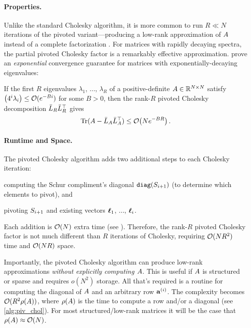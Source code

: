 \paragraph{Properties.}
Unlike the standard Cholesky algorithm, it is more common to run $R \ll N$ iterations of the pivoted variant---producing a low-rank approximation of $A$ instead of a complete factorization \cite{harbrecht2012low}.
For matrices with rapidly decaying spectra, the partial pivoted Cholesky factor is a remarkably effective approximation.
\citet{harbrecht2012low} prove an \emph{exponential} convergence guarantee for matrices with exponentially-decaying eigenvalues:
%
\begin{lemma}
\label{thm:harbrecht}
  If the first $R$ eigenvalues $\lambda_1$, $\ldots$, $\lambda_R$ of a positive-definite $A \in \mathbb{R}^{N \times N}$ satisfy $\left( 4^{i}\lambda_{i} \right) \leq \bigo{e^{-Bi}}$ for some $B>0$,
  then the rank-$R$ pivoted Cholesky decomposition $\bar{L}_{R} \bar{L}_R^\top$ gives
  \[
    \textrm{Tr}(\bA -  \bar\bL_A \bar\bL_A^\top) \leq \bigo{N e^{-BR}}.
  \]
\end{lemma}


\paragraph{Runtime and Space.}
The pivoted Cholesky algorithm adds two additional steps to each Cholesky iteration:
%
\begin{enumerate*}
  \item computing the Schur compliment's diagonal $\texttt{diag}(S_{i+1})$ (to determine which elements to pivot), and
  \item pivoting $S_{i+1}$ and existing vectors $\boldsymbol{\ell}_1$, $\ldots$, $\boldsymbol{\ell}_i$.
\end{enumerate*}
%
Each addition is $\bigo{N}$ extra time (see \citep[][Thm. 1]{harbrecht2012low}).
Therefore, the rank-$R$ pivoted Cholesky factor is not much different than $R$ iterations of Cholesky, requiring $\bigo{N R^2}$ time and $\bigo{NR}$ space.

Importantly, the pivoted Cholesky algorithm can produce low-rank approximations \emph{without explicitly computing $A$}.
This is useful if $A$ is structured or sparse and requires $o(N^2)$ storage.
All that's required is a routine for computing the diagonal of $A$ and an arbitrary row $\mathbf{a}^{(i)}$.
The complexity becomes $\bigo{R^2 \row{\bA}}$, where $\rho ( A )$ is the time to compute a row and/or a diagonal (see \cref{alg:piv_chol}).
For most structured/low-rank matrices it will be the case that $\row{\bA} \approx \bigo{N}$.


